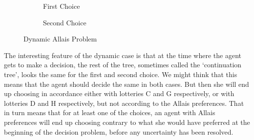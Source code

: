 \begin{figure}[ht]
    \begin{subfigure}[b]{0.49\textwidth}
        \caption{First Choice}
        \label{subf11}
    \end{subfigure}
    \begin{subfigure}[b]{0.49\textwidth}
        \caption{Second Choice}
        \label{subf12}
    \end{subfigure}
\caption{Dynamic Allais Problem}
\label{f1}
\end{figure}

The interesting feature of the dynamic case is that at the time where the agent gets to make a decision, the rest of the tree, sometimes called the `continuation tree', looks the same for the first and second choice. We might think that this means that the agent should decide the same in both cases. But then she will end up choosing in accordance either with lotteries C and G respectively, or with lotteries D and H respectively, but not according to the Allais preferences. That in turn means that for at least one of the choices, an agent with Allais preferences will end up choosing contrary to what she would have preferred at the beginning of the decision problem, before any uncertainty has been resolved.

